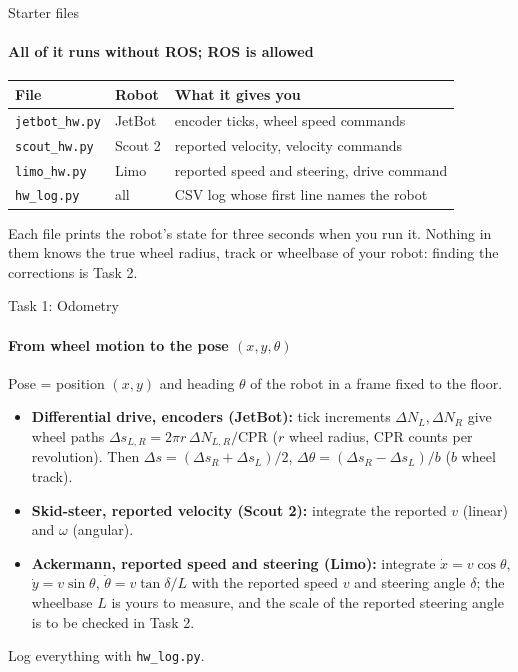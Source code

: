 \documentclass[aspectratio=169]{beamer}
\begin{document}
\begin{frame}[t]{Starter files}
\framesubtitle{All of it runs without ROS; ROS is allowed}
    \small
    \begin{center}
    \begin{tabular}{@{}lll@{}}
        \toprule
        File & Robot & What it gives you \\
        \midrule
        \texttt{jetbot\_hw.py} & JetBot & encoder ticks, wheel speed commands \\
        \texttt{scout\_hw.py}  & Scout 2 & reported velocity, velocity commands \\
        \texttt{limo\_hw.py}   & Limo & reported speed and steering, drive command \\
        \texttt{hw\_log.py}    & all & CSV log whose first line names the robot \\
        \bottomrule
    \end{tabular}
    \end{center}
    \smallskip

    Each file prints the robot's state for three seconds when you run it. Nothing in them
    knows the true wheel radius, track or wheelbase of your robot: finding the corrections
    is Task 2.
\end{frame}

\begin{frame}[t]{Task 1: Odometry}
\framesubtitle{From wheel motion to the pose $(x, y, \theta)$}
    Pose = position $(x, y)$ and heading $\theta$ of the robot in a frame fixed to the floor.
    \begin{itemize}
        \item \textbf{Differential drive, encoders (JetBot):} tick increments $\Delta N_L,\Delta N_R$ give wheel paths
              $\Delta s_{L,R} = 2\pi r\,\Delta N_{L,R}/\mathrm{CPR}$ ($r$ wheel radius,
              CPR counts per revolution). Then $\Delta s = (\Delta s_R+\Delta s_L)/2$,
              $\Delta\theta = (\Delta s_R-\Delta s_L)/b$ ($b$ wheel track).
        \item \textbf{Skid-steer, reported velocity (Scout 2):} integrate the reported $v$ (linear) and $\omega$ (angular).
        \item \textbf{Ackermann, reported speed and steering (Limo):} integrate $\dot x = v\cos\theta$, $\dot y = v\sin\theta$,
              $\dot\theta = v\tan\delta / L$ with the reported speed $v$ and steering angle
              $\delta$; the wheelbase $L$ is yours to measure, and the scale of the reported
              steering angle is to be checked in Task 2.
    \end{itemize}
    Log everything with \texttt{hw\_log.py}.
\end{frame}
\end{document}
